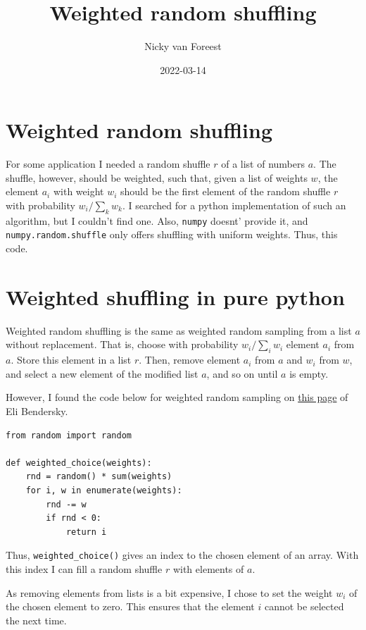 \documentclass[a4paper]{article}
\author{Nicky van Foreest}
\date{2022-03-14}
\title{Weighted random shuffling}
\begin{document}
\maketitle
\tableofcontents


\section{Weighted random shuffling}
\label{sec:orgc7b8895}

For some application I needed a random shuffle \(r\) of a list of numbers
\(a\). The shuffle, however, should be weighted, such that, given a list
of weights \(w\), the element \(a_i\) with weight \(w_i\) should be the first
element of the random shuffle \(r\) with probability \(w_i/\sum_k w_k\). I
searched for a python implementation of such an algorithm, but I
couldn't find one. Also, \texttt{numpy} doesnt' provide it, and
\texttt{numpy.random.shuffle} only offers shuffling with uniform weights. Thus,
this code.

\section{Weighted shuffling in pure python}
\label{sec:org36de902}

Weighted random shuffling is the same as weighted random sampling from a
list \(a\) without replacement. That is, choose with probability
\(w_{i}/\sum_{i} w_{i}\) element \(a_{i}\) from \(a\). Store this element in a list \(r\).
Then, remove element \(a_{i}\) from \(a\) and \(w_{i}\) from \(w\), and select a
new element of the modified list \(a\), and so on until \(a\) is empty.

However, I found the code below for weighted random sampling on  \href{https://eli.thegreenplace.net/2010/01/22/weighted-random-generation-in-python}{this page} of Eli Bendersky.

\begin{verbatim}
from random import random

def weighted_choice(weights):
    rnd = random() * sum(weights)
    for i, w in enumerate(weights):
        rnd -= w
        if rnd < 0:
            return i
\end{verbatim}

Thus, \texttt{weighted\_choice()} gives an index to the chosen element of an
array. With this index I can fill a random shuffle \(r\) with elements of
\(a\).

As removing elements from lists is a bit expensive, I chose to set the
weight \(w_{i}\) of the chosen element to zero. This ensures that the
element \(i\) cannot be selected the next time.
\end{document}
